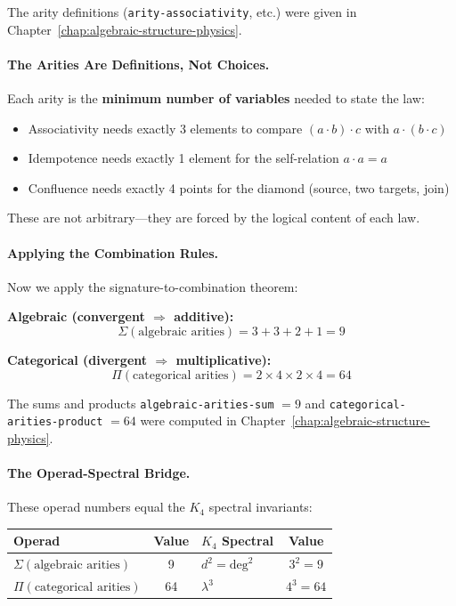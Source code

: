 \documentclass[11pt,a4paper]{book}
\begin{document}
The arity definitions (\verb|arity-associativity|, etc.) were given in 
Chapter~\ref{chap:algebraic-structure-physics}.

\paragraph{The Arities Are Definitions, Not Choices.}

Each arity is the \textbf{minimum number of variables} needed to state the law:

\begin{itemize}
\item Associativity needs exactly 3 elements to compare $(a \cdot b) \cdot c$ with $a \cdot (b \cdot c)$
\item Idempotence needs exactly 1 element for the self-relation $a \cdot a = a$
\item Confluence needs exactly 4 points for the diamond (source, two targets, join)
\end{itemize}

These are not arbitrary---they are forced by the logical content of each law.

\paragraph{Applying the Combination Rules.}

Now we apply the signature-to-combination theorem:

\textbf{Algebraic (convergent $\Rightarrow$ additive):}
$$\Sigma(\text{algebraic arities}) = 3 + 3 + 2 + 1 = 9$$

\textbf{Categorical (divergent $\Rightarrow$ multiplicative):}
$$\Pi(\text{categorical arities}) = 2 \times 4 \times 2 \times 4 = 64$$

The sums and products \verb|algebraic-arities-sum| $= 9$ and 
\verb|categorical-arities-product| $= 64$ were computed in 
Chapter~\ref{chap:algebraic-structure-physics}.

\paragraph{The Operad-Spectral Bridge.}

These operad numbers equal the $K_4$ spectral invariants:

\begin{center}
\begin{tabular}{lclc}
\textbf{Operad} & \textbf{Value} & \textbf{$K_4$ Spectral} & \textbf{Value} \\
\hline
$\Sigma(\text{algebraic arities})$ & 9 & $d^2 = \text{deg}^2$ & $3^2 = 9$ \\
$\Pi(\text{categorical arities})$ & 64 & $\lambda^3$ & $4^3 = 64$ \\
\end{tabular}
\end{center}
\end{document}
